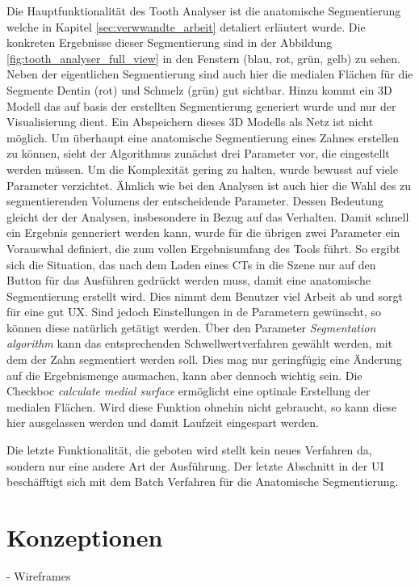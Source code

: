 Die Hauptfunktionalität des Tooth Analyser ist die anatomische Segmentierung welche
in Kapitel \ref{sec:verwwandte_arbeit} detaliert erläutert wurde. Die konkreten
Ergebnisse dieser Segmentierung sind in der Abbildung
\ref{fig:tooth_analyser_full_view} in den Fenstern (blau, rot, grün, gelb) zu sehen.
Neben der eigentlichen Segmentierung sind auch hier die medialen Flächen für die
Segmente Dentin (rot) und Schmelz (grün) gut sichtbar. Hinzu kommt ein \ac{3D}
Modell das auf basis der erstellten Segmentierung generiert wurde und nur der
Visualisierung dient. Ein Abspeichern dieses 3D Modells als Netz ist nicht möglich.
Um überhaupt eine anatomische Segmentierung eines Zahnes erstellen zu können, sieht
der Algorithmus zunächst drei Parameter vor, die eingestellt werden müssen. Um die
Komplexität gering zu halten, wurde bewusst auf viele Parameter verzichtet. Ähnlich
wie bei den Analysen ist auch hier die Wahl des zu segmentierenden Volumens der entscheidende
Parameter. Dessen Bedeutung gleicht der der Analysen, insbesondere in Bezug auf das
Verhalten. Damit schnell ein Ergebnis genneriert werden kann, wurde für die übrigen
zwei Parameter ein Vorauswhal definiert, die zum vollen Ergebnisumfang des Tools
führt. So ergibt sich die Situation, das nach dem Laden eines \ac{CT}s in die
Szene nur auf den Button für das Ausführen gedrückt werden muss, damit eine anatomische
Segmentierung erstellt wird. Dies nimmt dem Benutzer viel Arbeit ab und sorgt
für eine gut \ac{UX}. Sind jedoch Einstellungen in de Parametern gewünscht, so können
diese natürlich getätigt werden. Über den Parameter \textit{Segmentation
algorithm} kann das entsprechenden Schwellwertverfahren gewählt werden, mit dem
der Zahn segmentiert werden soll. Dies mag nur geringfügig eine Änderung auf die
Ergebnismenge ausmachen, kann aber dennoch wichtig sein. Die Checkboc \textit{calculate
medial surface} ermöglicht eine optinale Erstellung der medialen Flächen. Wird diese
Funktion ohnehin nicht gebraucht, so kann diese hier ausgelassen werden und
damit Laufzeit eingespart werden.

Die letzte Funktionalität, die geboten wird stellt kein neues Verfahren da,
sondern nur eine andere Art der Ausführung. Der letzte Abschnitt in der \ac{UI}
beschäfftigt sich mit dem Batch Verfahren für die Anatomische Segmentierung.

\section{Konzeptionen}
- Wireframes

